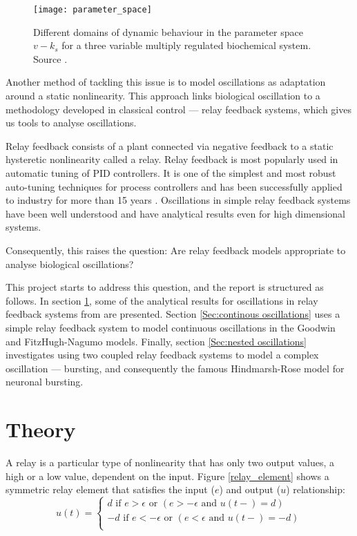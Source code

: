 \documentclass[a4paper, 12pt]{article}
\begin{document}
\begin{figure}[h!]
\texttt{[image: parameter\_space]}
\caption{Different domains of dynamic behaviour in the parameter space $v-k_s$ for a three variable multiply regulated biochemical system. Source \cite{goldbeter2}.}
\label{parameter_search}
\end{figure}

Another method of tackling this issue is to model oscillations as adaptation around a static nonlinearity. This approach links biological oscillation to a methodology developed in classical control --- relay feedback systems, which gives us tools to analyse oscillations.

Relay feedback consists of a plant connected via negative feedback to a static hysteretic nonlinearity called a relay. Relay feedback is most popularly used in automatic tuning of PID controllers. It is one of the simplest and most robust auto-tuning techniques for process controllers and has been successfully applied to industry for more than 15 years \cite{hang}. Oscillations in simple relay feedback systems have been well understood and have analytical results even for high dimensional systems. 

Consequently, this raises the question: Are relay feedback models appropriate to analyse biological oscillations? 
 
This project starts to address this question, and the report is structured as follows. In section \ref{Sec:theory}, some of the analytical results for oscillations in relay feedback systems from \cite{astrom1995} are presented. Section \ref{Sec:continous oscillations} uses a simple relay feedback system to model continuous oscillations in the Goodwin and FitzHugh-Nagumo models. Finally, section \ref{Sec:nested oscillations} investigates using two coupled relay feedback systems to model a complex oscillation --- bursting, and consequently the famous Hindmarsh-Rose model for neuronal bursting.   
\newpage
\section{Theory}\label{Sec:theory}
A relay is a particular type of nonlinearity that has only two output values, a high or a low value, dependent on the input. Figure \ref{relay_element} shows a symmetric relay element that satisfies the input ($e$) and output ($u$) relationship:
\begin{equation}
	u(t)=\begin{cases}
	               d \text{ if } e > \epsilon \text{ or } (e >-\epsilon \text{ and } u(t-) = d)\\
	                -d \text{ if } e < -\epsilon \text{ or } (e < \epsilon \text{ and } u(t-) = -d)\\
	              
	            \end{cases}
	            \label{eq:symmetric_relay_equation}
\end{equation}
\end{document}
